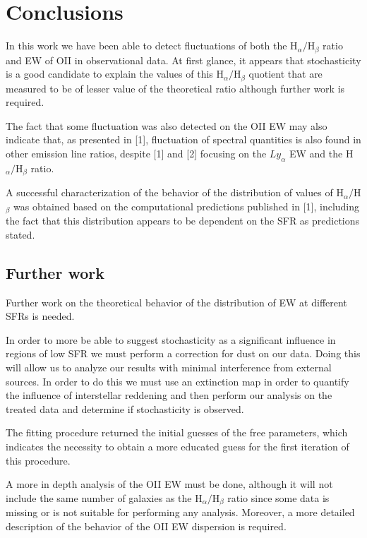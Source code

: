 \chapter{Conclusions}

In this work we have been able to detect fluctuations of both the H$_{\alpha}/$H$_{\beta}$ ratio and EW of OII in observational data. At first
glance, it appears that stochasticity is a good candidate to explain the values of this H$_{\alpha}/$H$_{\beta}$ quotient that are measured to be
of lesser value of the theoretical ratio although further work is required.

The fact that some fluctuation was also detected on the OII EW may also indicate that, as presented in [1], fluctuation of spectral quantities is
also found in other emission line ratios, despite [1] and [2] focusing on the $Ly_{\alpha}$ EW and the H$_{\alpha}/$H$_{\beta}$ ratio.

A successful characterization of the behavior of the distribution of values of H$_{\alpha}/$H$_{\beta}$ was obtained based on the computational
predictions published in [1], including the fact that this distribution appears to be dependent on the SFR as predictions stated.

\section{Further work}

Further work on the theoretical behavior of the distribution of EW at different SFRs is needed.

In order to more be able to suggest stochasticity as a significant influence in regions of low SFR we must perform a correction for dust on our data.
Doing this will allow us to analyze our results with minimal interference from external sources. In order to do this we must use an extinction
map in order to quantify the influence of interstellar reddening and then perform our analysis on the treated data and determine if stochasticity is
observed.

The fitting procedure returned the initial guesses of the free parameters, which indicates the necessity to obtain a more educated guess for the first
iteration of this procedure.

A more in depth analysis of the OII EW must be done, although it will not include the same number of galaxies as the H$_{\alpha}/$H$_{\beta}$ ratio
since some data is missing or is not suitable for performing any analysis. Moreover, a more detailed description of the behavior of the OII EW
dispersion is required.
